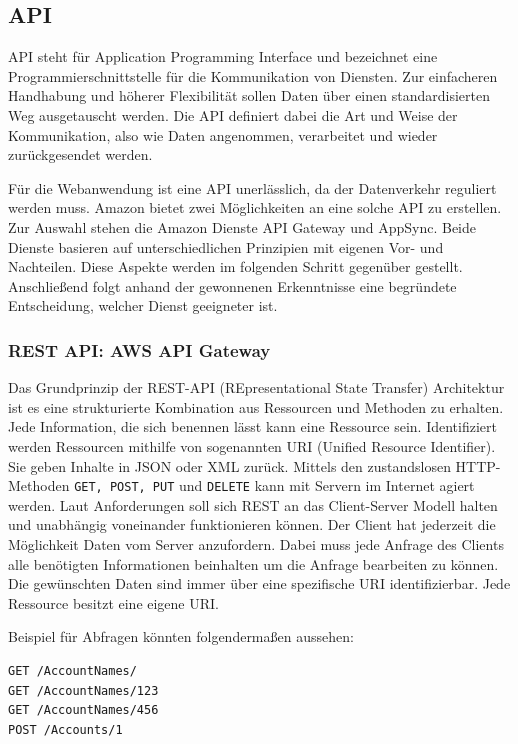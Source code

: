 

\subsection{API}
API steht für Application Programming Interface und bezeichnet eine Programmierschnittstelle für die Kommunikation von Diensten.
Zur einfacheren Handhabung und höherer Flexibilität sollen Daten über einen standardisierten Weg ausgetauscht werden. Die API definiert
dabei die Art und Weise der Kommunikation, also wie Daten angenommen, verarbeitet und wieder zurückgesendet werden.

Für die Webanwendung ist eine API unerlässlich, da der Datenverkehr reguliert werden muss.
Amazon bietet zwei Möglichkeiten an eine solche API zu erstellen.
Zur Auswahl stehen die Amazon Dienste API Gateway und AppSync.
Beide Dienste basieren auf unterschiedlichen Prinzipien mit eigenen Vor- und Nachteilen.
Diese Aspekte werden im folgenden Schritt gegenüber gestellt.
Anschließend folgt anhand der gewonnenen Erkenntnisse eine begründete Entscheidung, welcher Dienst geeigneter ist.


\subsubsection{REST API: AWS API Gateway}
Das Grundprinzip der REST-API (REpresentational State Transfer) Architektur ist es eine strukturierte Kombination aus Ressourcen und Methoden zu erhalten.
Jede Information, die sich benennen lässt kann eine Ressource sein.
Identifiziert werden Ressourcen mithilfe von sogenannten URI (Unified Resource Identifier).
Sie geben Inhalte in JSON oder XML zurück.
Mittels den zustandslosen HTTP-Methoden \verb+GET, POST, PUT+ und \verb+DELETE+ kann mit Servern im Internet agiert werden.
Laut Anforderungen soll sich REST an das Client-Server Modell halten und unabhängig voneinander funktionieren können.
Der Client hat jederzeit die Möglichkeit Daten vom Server anzufordern.
Dabei muss jede Anfrage des Clients alle benötigten Informationen beinhalten um die Anfrage bearbeiten zu können.
Die gewünschten Daten sind immer über eine spezifische URI identifizierbar.
Jede Ressource besitzt eine eigene URI.\cite[]{REST}

Beispiel für Abfragen könnten folgendermaßen aussehen:

\begin{lstlisting}[basicstyle=\ttfamily, breaklines=true , frame = single, backgroundcolor=\color{flashwhite} ]
GET /AccountNames/
GET /AccountNames/123
GET /AccountNames/456
POST /Accounts/1
\end{lstlisting}

